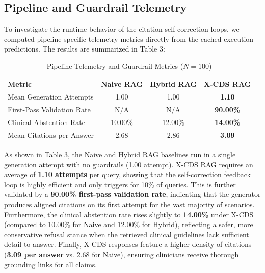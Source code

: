 \documentclass[sn-mathphys,Numbered]{sn-jnl}%
\begin{document}
\subsection{Pipeline and Guardrail Telemetry}
To investigate the runtime behavior of the citation self-correction loops, we computed pipeline-specific telemetry metrics directly from the cached execution predictions. The results are summarized in Table 3:

\begin{table}[ht]
\centering
\caption{Pipeline Telemetry and Guardrail Metrics ($N=100$)}
\label{tab3}
\begin{tabular}{lccc}
\toprule
Metric & Naive RAG & Hybrid RAG & X-CDS RAG \\
\midrule
Mean Generation Attempts & 1.00 & 1.00 & \textbf{1.10} \\
First-Pass Validation Rate & N/A & N/A & \textbf{90.00\%} \\
Clinical Abstention Rate & 10.00\% & 12.00\% & \textbf{14.00\%} \\
Mean Citations per Answer & 2.68 & 2.86 & \textbf{3.09} \\
\bottomrule
\end{tabular}
\end{table}

As shown in Table 3, the Naive and Hybrid RAG baselines run in a single generation attempt with no guardrails (1.00 attempt). X-CDS RAG requires an average of \textbf{1.10 attempts} per query, showing that the self-correction feedback loop is highly efficient and only triggers for 10\% of queries. This is further validated by a \textbf{90.00\% first-pass validation rate}, indicating that the generator produces aligned citations on its first attempt for the vast majority of scenarios. Furthermore, the clinical abstention rate rises slightly to \textbf{14.00\%} under X-CDS (compared to 10.00\% for Naive and 12.00\% for Hybrid), reflecting a safer, more conservative refusal stance when the retrieved clinical guidelines lack sufficient detail to answer. Finally, X-CDS responses feature a higher density of citations (\textbf{3.09 per answer} vs. 2.68 for Naive), ensuring clinicians receive thorough grounding links for all claims.
\end{document}
